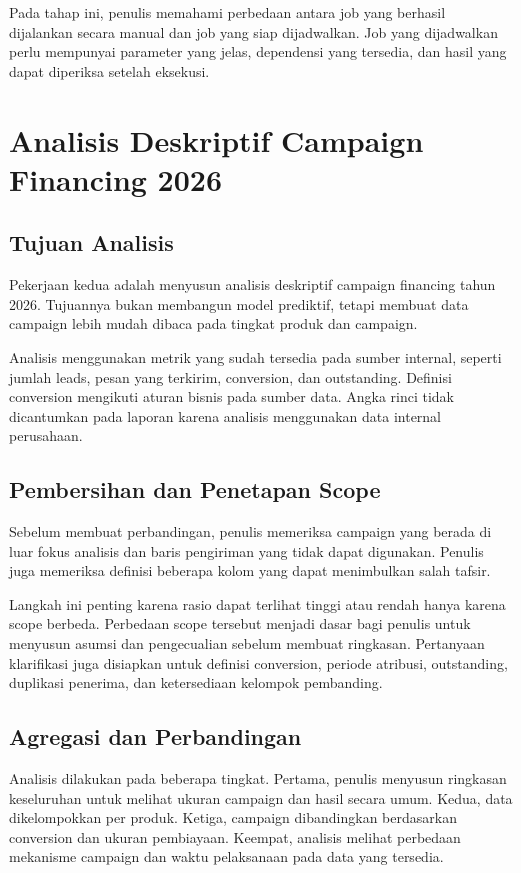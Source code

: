 Pada tahap ini, penulis memahami perbedaan antara job yang berhasil dijalankan secara manual dan job yang siap dijadwalkan. Job yang dijadwalkan perlu mempunyai parameter yang jelas, dependensi yang tersedia, dan hasil yang dapat diperiksa setelah eksekusi.

\section{Analisis Deskriptif Campaign Financing 2026}

\subsection{Tujuan Analisis}
Pekerjaan kedua adalah menyusun analisis deskriptif campaign financing tahun 2026. Tujuannya bukan membangun model prediktif, tetapi membuat data campaign lebih mudah dibaca pada tingkat produk dan campaign.

Analisis menggunakan metrik yang sudah tersedia pada sumber internal, seperti jumlah leads, pesan yang terkirim, conversion, dan outstanding. Definisi conversion mengikuti aturan bisnis pada sumber data. Angka rinci tidak dicantumkan pada laporan karena analisis menggunakan data internal perusahaan.

\subsection{Pembersihan dan Penetapan Scope}
Sebelum membuat perbandingan, penulis memeriksa campaign yang berada di luar fokus analisis dan baris pengiriman yang tidak dapat digunakan. Penulis juga memeriksa definisi beberapa kolom yang dapat menimbulkan salah tafsir.

Langkah ini penting karena rasio dapat terlihat tinggi atau rendah hanya karena scope berbeda. Perbedaan scope tersebut menjadi dasar bagi penulis untuk menyusun asumsi dan pengecualian sebelum membuat ringkasan. Pertanyaan klarifikasi juga disiapkan untuk definisi conversion, periode atribusi, outstanding, duplikasi penerima, dan ketersediaan kelompok pembanding.

\subsection{Agregasi dan Perbandingan}
Analisis dilakukan pada beberapa tingkat. Pertama, penulis menyusun ringkasan keseluruhan untuk melihat ukuran campaign dan hasil secara umum. Kedua, data dikelompokkan per produk. Ketiga, campaign dibandingkan berdasarkan conversion dan ukuran pembiayaan. Keempat, analisis melihat perbedaan mekanisme campaign dan waktu pelaksanaan pada data yang tersedia.

